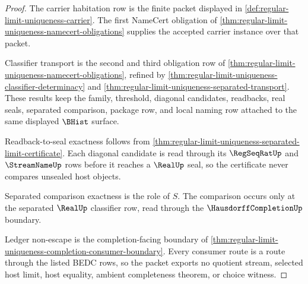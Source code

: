 \begin{proof}
The carrier habitation row is the finite packet displayed in \autoref{def:regular-limit-uniqueness-carrier}. The first NameCert obligation of \autoref{thm:regular-limit-uniqueness-namecert-obligations} supplies the accepted carrier instance over that packet.

Classifier transport is the second and third obligation row of \autoref{thm:regular-limit-uniqueness-namecert-obligations}, refined by \autoref{thm:regular-limit-uniqueness-classifier-determinacy} and \autoref{thm:regular-limit-uniqueness-separated-transport}. These results keep the family, threshold, diagonal candidates, readbacks, real seals, separated comparison, package row, and local naming row attached to the same displayed $\BHist$ surface.

Readback-to-seal exactness follows from \autoref{thm:regular-limit-uniqueness-separated-limit-certificate}. Each diagonal candidate is read through its $\RegSeqRatUp$ and $\StreamNameUp$ rows before it reaches a $\RealUp$ seal, so the certificate never compares unsealed host objects.

Separated comparison exactness is the role of $S$. The comparison occurs only at the separated $\RealUp$ classifier row, read through the $\HausdorffCompletionUp$ boundary.

Ledger non-escape is the completion-facing boundary of \autoref{thm:regular-limit-uniqueness-completion-consumer-boundary}. Every consumer route is a route through the listed BEDC rows, so the packet exports no quotient stream, selected host limit, host equality, ambient completeness theorem, or choice witness.
\end{proof}

